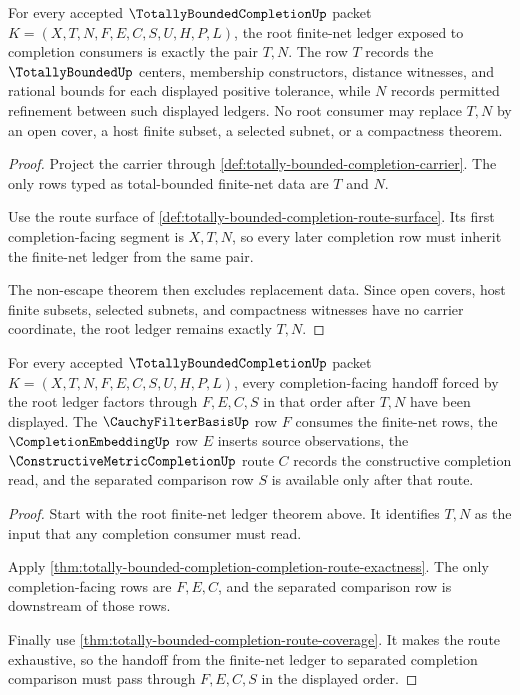 \begin{theorem}
\label{thm:totally-bounded-completion-root-net-ledger}
For every accepted $\TotallyBoundedCompletionUp$ packet $K=(X,T,N,F,E,C,S,U,H,P,L)$, the root finite-net ledger exposed to completion consumers is exactly the pair $T,N$. The row $T$ records the $\TotallyBoundedUp$ centers, membership constructors, distance witnesses, and rational bounds for each displayed positive tolerance, while $N$ records permitted refinement between such displayed ledgers. No root consumer may replace $T,N$ by an open cover, a host finite subset, a selected subnet, or a compactness theorem.
\end{theorem}
\begin{proof}
Project the carrier through \autoref{def:totally-bounded-completion-carrier}. The only rows typed as total-bounded finite-net data are $T$ and $N$.

Use the route surface of \autoref{def:totally-bounded-completion-route-surface}. Its first completion-facing segment is $X,T,N$, so every later completion row must inherit the finite-net ledger from the same pair.

The non-escape theorem then excludes replacement data. Since open covers, host finite subsets, selected subnets, and compactness witnesses have no carrier coordinate, the root ledger remains exactly $T,N$.
\end{proof}

\begin{theorem}
\label{thm:totally-bounded-completion-root-completion-handoff}
For every accepted $\TotallyBoundedCompletionUp$ packet $K=(X,T,N,F,E,C,S,U,H,P,L)$, every completion-facing handoff forced by the root ledger factors through $F,E,C,S$ in that order after $T,N$ have been displayed. The $\CauchyFilterBasisUp$ row $F$ consumes the finite-net rows, the $\CompletionEmbeddingUp$ row $E$ inserts source observations, the $\ConstructiveMetricCompletionUp$ route $C$ records the constructive completion read, and the separated comparison row $S$ is available only after that route.
\end{theorem}
\begin{proof}
Start with the root finite-net ledger theorem above. It identifies $T,N$ as the input that any completion consumer must read.

Apply \autoref{thm:totally-bounded-completion-completion-route-exactness}. The only completion-facing rows are $F,E,C$, and the separated comparison row is downstream of those rows.

Finally use \autoref{thm:totally-bounded-completion-route-coverage}. It makes the route exhaustive, so the handoff from the finite-net ledger to separated completion comparison must pass through $F,E,C,S$ in the displayed order.
\end{proof}

